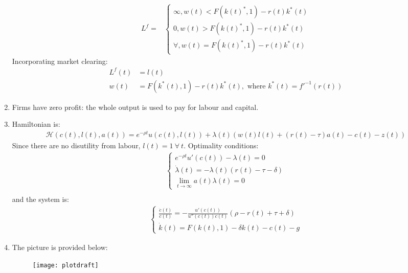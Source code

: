 \documentclass[a4paper]{article}
\begin{document}
\begin{enumerate}
\begin{align*}
L^f = &\begin{cases}
\infty, w(t) < F(k(t)^*, 1) - r(t)k^*(t)\\
0, w(t) > F(k(t)^*, 1) - r(t)k^*(t)\\
\forall, w(t) = F(k(t)^*, 1) - r(t)k^*(t)
\end{cases}
\end{align*}
Incorporating market clearing:
\begin{align*}
L^f(t) &= l(t)\\
w(t) &= F(k^*(t), 1) - r(t)k^*(t), \text{ where } k^*(t) = f'^{-1}(r(t))
\end{align*}
\item Firms have zero profit: the whole output is used to pay for labour and capital.
\item Hamiltonian is:
\begin{align*}
\mathscr{H}(c(t), l(t), a(t)) = e^{-\rho t}u(c(t), l(t)) + \lambda(t)(w(t)l(t) + (r(t) - \tau)a(t) - c(t) - z(t))
\end{align*}
Since there are no disutility from labour, $l(t) = 1\ \forall\ t$.
Optimality conditions:
\begin{align*}
\begin{cases}
e^{-\rho t}u'(c(t)) - \lambda(t) = 0\\
\dot{\lambda}(t) = -\lambda(t)(r(t) - \tau - \delta)\\
\lim_{t \to \infty} a(t)\lambda(t) = 0
\end{cases}\\
\end{align*}
and the system is:
\begin{align*}
\begin{cases}
\frac{\dot{c}(t)}{c(t)} = -\frac{u'(c(t))}{u''(c(t))c(t)}(\rho - r(t) + \tau + \delta)\\
\dot{k}(t) = F(k(t), 1) - \delta k(t) - c(t) - g
\end{cases}
\end{align*}
\item The picture is provided below:
	\begin{figure}[H]
	\centering
	\texttt{[image: plotdraft]}
	\caption{}\label{fig1}
\end{figure}


\end{enumerate}
\end{document}
